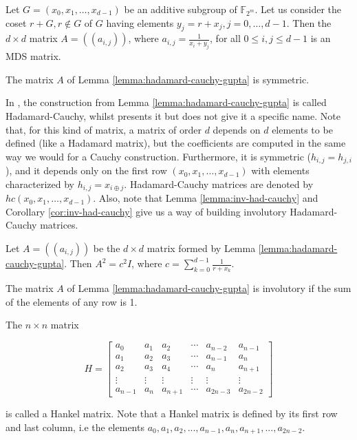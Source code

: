 \begin{lemma}\label{lemma:hadamard-cauchy-gupta}
Let $G = (x_0, x_1, …, x_{d-1})$ be an additive subgroup of $\mathbb{F}_{2^m}$. Let us consider the coset $r+G, r \not\in G$ of $G$ having elements $y_j = r + x_j, j = 0, …, d-1$. Then the $d \times d$ matrix $A = ((a_{i,j}))$, where $a_{i,j} = \frac{1}{x_i+y_j}$, for all $0 \leq i,j \leq d - 1$ is an MDS matrix. 
\end{lemma}

\begin{corollary}
The matrix $A$ of Lemma \ref{lemma:hadamard-cauchy-gupta} is symmetric.
\end{corollary}

In \cite{LwInvolKhoo2015}, the construction from Lemma \ref{lemma:hadamard-cauchy-gupta} is called Hadamard-Cauchy, whilst \cite{Gupta2013OnCO} presents it but does not give it a specific name. Note that, for this kind of matrix, a matrix of order $d$ depends on $d$ elements to be defined (like a Hadamard matrix), but the coefficients are computed in the same way we would for a Cauchy construction. Furthermore, it is symmetric ($h_{i,j} = h_{j,i}$), and it depends only on the first row $(x_0, x_1, …, x_{d-1})$ with elements characterized by $h_{i,j} = x_{i \oplus j}$. Hadamard-Cauchy matrices are denoted by $hc(x_0, x_1, …, x_{d-1})$. Also, note that Lemma \ref{lemma:inv-had-cauchy} and Corollary \ref{cor:inv-had-cauchy} give us a way of building involutory Hadamard-Cauchy matrices.

\begin{lemma}\label{lemma:inv-had-cauchy}
Let $A = ((a_{i,j}))$ be the $d \times d$ matrix formed by Lemma \ref{lemma:hadamard-cauchy-gupta}. Then $A^2 = c^2I$, where $c = \sum_{k=0}^{d-1} \frac{1}{r+x_k}$.
\end{lemma}

\begin{corollary}\label{cor:inv-had-cauchy}
The matrix $A$ of Lemma \ref{lemma:hadamard-cauchy-gupta} is involutory if the sum of the elements of any row is 1.
\end{corollary}

\begin{definition}
The $n \times n$ matrix

$$
H = 
\begin{bmatrix}
a_0 & a_1 & a_2 & \cdots & a_{n-2} & a_{n-1} \\
a_1 & a_2 & a_3 & \cdots & a_{n-1} & a_{n} \\
a_2 & a_3 & a_4 & \cdots & a_{n} & a_{n+1} \\
\vdots & \vdots & \vdots & \vdots & \vdots & \vdots \\
a_{n-1} & a_{n} & a_{n+1} & \cdots & a_{2n-3} & a_{2n-2}
\end{bmatrix}
$$

is called a Hankel matrix. Note that a Hankel matrix is defined by its first row and last column, i.e the elements $a_0, a_1, a_2, ..., a_{n-1}, a_n, a_{n+1}, ..., a_{2n-2}$.
\end{definition}

